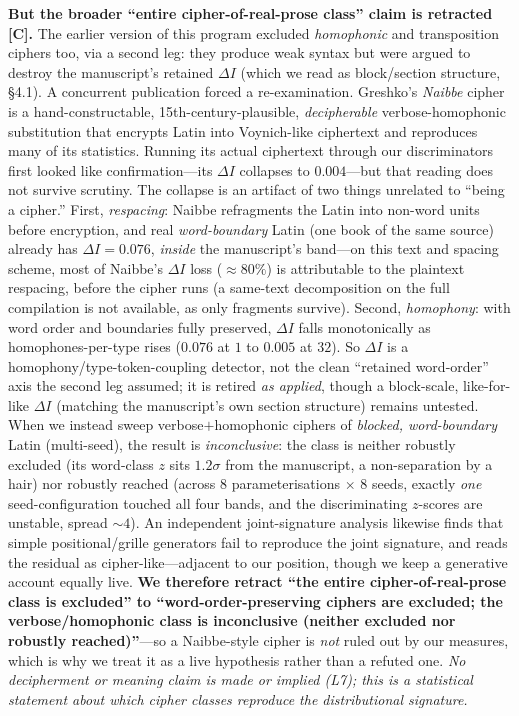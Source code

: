 \documentclass[11pt]{article}
\newcommand{\grade}[1]{{\small\textbf{[#1]}}}
\begin{document}
\textbf{But the broader ``entire cipher-of-real-prose class'' claim is retracted \grade{C}.}
The earlier version of this program excluded \emph{homophonic} and transposition ciphers too,
via a second leg: they produce weak syntax but were argued to destroy the manuscript's
retained $\Delta I$ (which we read as block/section structure, \S4.1). A concurrent
publication forced a re-examination. Greshko's \emph{Naibbe} cipher \citep{greshko2025naibbe}
is a hand-constructable, 15th-century-plausible, \emph{decipherable} verbose-homophonic
substitution that encrypts Latin into Voynich-like ciphertext and reproduces many of its
statistics. Running its actual ciphertext through our discriminators first looked like
confirmation---its $\Delta I$ collapses to $0.004$---but that reading does not survive scrutiny.
The collapse is an artifact of two things unrelated to ``being a cipher.'' First,
\emph{respacing}: Naibbe refragments the Latin into non-word units before encryption, and
real \emph{word-boundary} Latin (one book of the same source) already has $\Delta I=0.076$,
\emph{inside} the manuscript's band---on this text and spacing scheme, most of Naibbe's
$\Delta I$ loss ($\approx\!80\%$) is attributable to the plaintext respacing, before the cipher
runs (a same-text decomposition on the full compilation is not available, as only fragments
survive). Second, \emph{homophony}: with word order and boundaries fully preserved, $\Delta I$
falls monotonically as homophones-per-type rises ($0.076$ at $1$ to $0.005$ at $32$). So
$\Delta I$ is a homophony/type-token-coupling detector, not the clean ``retained word-order''
axis the second leg assumed; it is retired \emph{as applied}, though a block-scale, like-for-like
$\Delta I$ (matching the manuscript's own section structure) remains untested. When we instead
sweep verbose$+$homophonic ciphers of \emph{blocked, word-boundary} Latin (multi-seed), the
result is \emph{inconclusive}: the class is neither robustly excluded (its word-class $z$ sits
$1.2\sigma$ from the manuscript, a non-separation by a hair) nor robustly reached (across
$8$ parameterisations $\times$ $8$ seeds, exactly \emph{one} seed-configuration touched all
four bands, and the discriminating $z$-scores are unstable, spread $\sim\!4$). An independent
joint-signature analysis \citep{parisel2026layered} likewise finds that simple positional/grille
generators fail to reproduce the joint signature, and reads the residual as cipher-like---adjacent
to our position, though we keep a generative account equally live.
\textbf{We therefore retract ``the entire cipher-of-real-prose class is excluded'' to
``word-order-preserving ciphers are excluded; the verbose/homophonic class is inconclusive
(neither excluded nor robustly reached)''}---so a Naibbe-style cipher is \emph{not} ruled out
by our measures, which is why we treat it as a live hypothesis rather than a refuted one.
\emph{No decipherment or meaning claim is made
or implied (L7); this is a statistical statement about which cipher classes reproduce the
distributional signature.}
\end{document}
